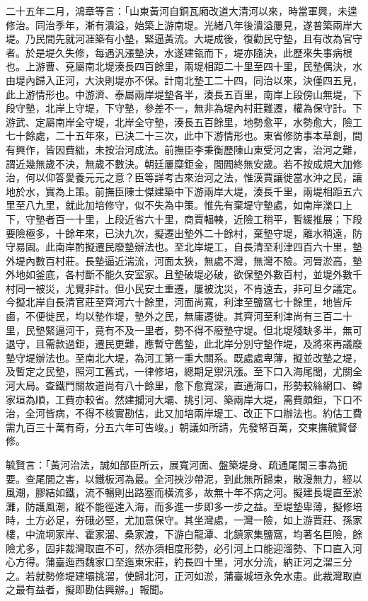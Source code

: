 \begin{pinyinscope}
二十五年二月，鴻章等言：「山東黃河自銅瓦廂改道大清河以來，時當軍興，未遑修治。同治季年，漸有潰溢，始築上游南堤。光緒八年後潰溢屢見，遂普築兩岸大堤。乃民間先就河涯築有小墊，緊逼黃流。大堤成後，復勸民守墊，且有改為官守者。於是堤久失修，每遇汎漲墊決，水遂建瓴而下，堤亦隨決，此歷來失事病根也。上游曹、兗屬南北堤湊長四百餘里，兩堤相距二十里至四十里，民墊偶決，水由堤內歸入正河，大決則堤亦不保。計南北墊工二十四，同治以來，決僅四五見，此上游情形也。中游濟、泰屬兩岸堤墊各半，湊長五百里，南岸上段傍山無堤，下段守墊，北岸上守堤，下守墊，參差不一，無非為堤內村莊難遷，權為保守計。下游武、定屬南岸全守堤，北岸全守墊，湊長五百餘里，地勢愈平，水勢愈大，險工七十餘處，二十五年來，已決二十三次，此中下游情形也。東省修防事本草創，間有興作，皆因費絀，未按治河成法。前撫臣李秉衡歷陳山東受河之害，治河之難，謂近幾無歲不決，無歲不數決。朝廷屢糜鉅金，閭閻終無安歲。若不按成規大加修治，何以仰答愛養元元之意？臣等詳考古來治河之法，惟漢賈讓徙當水沖之民，讓地於水，實為上策。前撫臣陳士傑建築中下游兩岸大堤，湊長千里，兩堤相距五六里至八九里，就此加培修守，似不失為中策。惟先有棄堤守墊處，如南岸濼口上下，守墊者百一十里，上段近省六十里，商賈輻輳，近險工稍平，暫緩推展；下段要險極多，十餘年來，已決九次，擬遷出墊外二十餘村，棄墊守堤，離水稍遠，防守易固。此南岸酌擬遷民廢墊辦法也。至北岸堤工，自長清至利津四百六十里，墊外堤內數百村莊。長墊逼近湍流，河面太狹，無處不灣，無灣不險。河脣淤高，墊外地如釜底，各村斷不能久安室家。且墊破堤必破，欲保墊外數百村，並堤外數千村同一被災，尤覺非計。但小民安土重遷，屢被沈災，不肯遠去，非可旦夕議定。今擬北岸自長清官莊至齊河六十餘里，河面尚寬，利津至鹽窩七十餘里，地皆斥鹵，不便徙民，均以墊作堤，墊外之民，無庸遷徙。其齊河至利津尚有三百二十里，民墊緊逼河干，竟有不及一里者，勢不得不廢墊守堤。但北堤殘缺多半，無可退守，且需款過鉅，遷民更難，應暫守舊墊，此北岸分別守墊作堤，及將來再議廢墊守堤辦法也。至南北大堤，為河工第一重大關系。既處處卑薄，擬並改墊之堤，及暫定之民墊，照河工舊式，一律修培，總期足禦汛漲。至下口入海尾閭，尤關全河大局。查鐵門關故道尚有八十餘里，愈下愈寬深，直通海口，形勢較絲網口、韓家垣為順，工費亦較省。然建攔河大壩、挑引河、築兩岸大堤，需費頗鉅，下口不治，全河皆病，不得不核實勘估，此又加培兩岸堤工、改正下口辦法也。約估工費需九百三十萬有奇，分五六年可告竣。」朝議如所請，先發帑百萬，交東撫毓賢督修。

毓賢言：「黃河治法，誠如部臣所云，展寬河面、盤築堤身、疏通尾閭三事為扼要。查尾閭之害，以鐵板河為最。全河挾沙帶泥，到此無所歸束，散漫無力，經以風潮，膠結如鐵，流不暢則出路塞而橫流多，故無十年不病之河。擬建長堤直至淤灘，防護風潮，縱不能徑達入海，而多進一步即多一步之益。至堤墊卑薄，擬修培時，土方必足，夯硪必堅，尤加意保守。其坐灣處，一灣一險，如上游賈莊、孫家樓，中流坰家岸、霍家溜、桑家渡，下游白龍潭、北鎮家集鹽窩，均著名巨險，餘險尤多，固非裁灣取直不可，然亦須相度形勢，必引河上口能迎溜勢、下口直入河心方得。蒲臺迤西魏家口至迤東宋莊，約長四十里，河水分流，納正河之溜三分之。若就勢修堤建壩挑溜，使歸北河，正河如淤，蒲臺城垣永免水患。此裁灣取直之最有益者，擬即勘估興辦。」報聞。


\end{pinyinscope}
